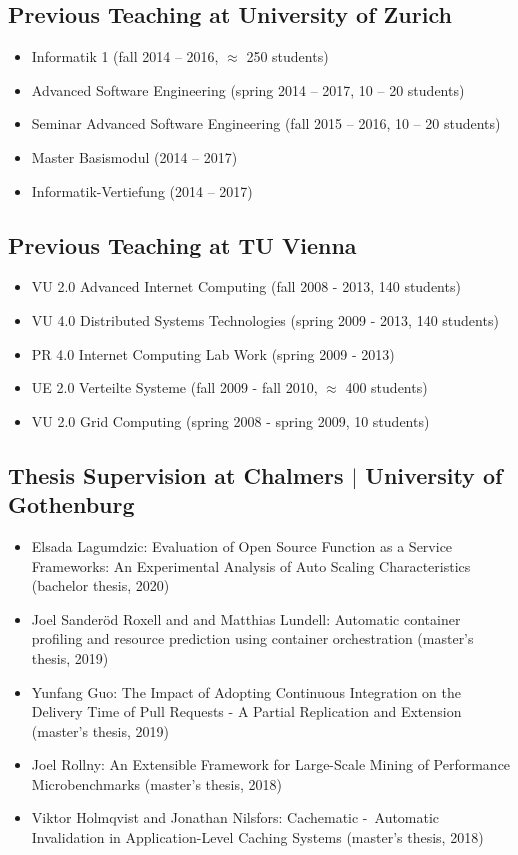 \documentclass[paper=letter,fontsize=11pt]{scrartcl} %
\begin{document}
\subsection*{Previous Teaching at University of Zurich}
\begin{itemize}
  \item Informatik 1 (fall 2014 -- 2016, $\approx$ 250 students)
  \item Advanced Software Engineering (spring 2014 -- 2017, 10 -- 20 students)
  \item Seminar Advanced Software Engineering (fall 2015 -- 2016, 10 -- 20 students)
  \item Master Basismodul (2014 -- 2017)
  \item Informatik-Vertiefung (2014 -- 2017)
\end{itemize}

\subsection*{Previous Teaching at TU Vienna}
\begin{itemize}
  \item VU 2.0 Advanced Internet Computing (fall 2008 - 2013, 140 students)
  \item VU 4.0 Distributed Systems Technologies (spring 2009 - 2013, 140 students)
  \item PR 4.0 Internet Computing Lab Work (spring 2009 - 2013)
  \item UE 2.0 Verteilte Systeme (fall 2009 - fall 2010, $\approx$ 400 students)
  \item VU 2.0 Grid Computing (spring 2008 - spring 2009, 10 students)
\end{itemize}

\subsection*{Thesis Supervision at Chalmers $|$ University of Gothenburg}

\begin{itemize}
	\item Elsada Lagumdzic: Evaluation of Open Source Function as a Service Frameworks: An Experimental Analysis of Auto Scaling Characteristics (bachelor thesis, 2020)
	\item Joel Sanderöd Roxell and and Matthias Lundell: Automatic container profiling
and resource prediction using container orchestration (master's thesis, 2019)
	\item Yunfang Guo: The Impact of Adopting Continuous Integration on the Delivery Time of Pull Requests - A Partial Replication and Extension (master's thesis, 2019)
	\item Joel Rollny: An Extensible Framework for Large-Scale Mining of Performance Microbenchmarks (master's thesis, 2018)
  \item Viktor Holmqvist and Jonathan Nilsfors: Cachematic - Automatic Invalidation in Application-Level Caching Systems (master's thesis, 2018)
\end{itemize}
\end{document}
